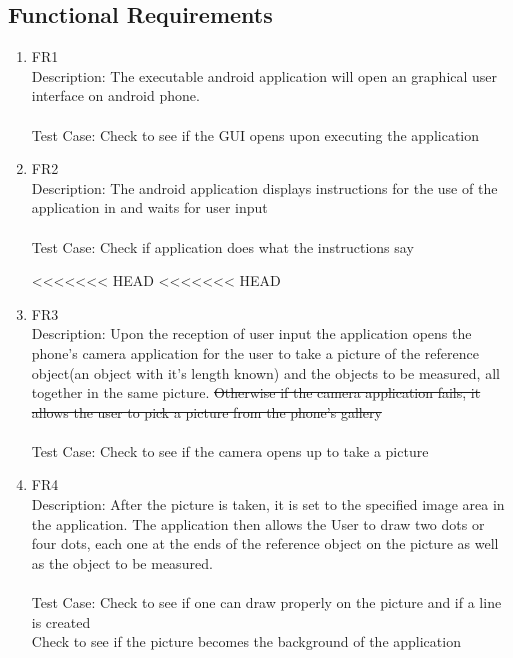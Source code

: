 \documentclass[12pt, titlepage]{article}
\begin{document}
\subsection{Functional Requirements}
\begin{enumerate}{}{}
\item FR1 \\Description: The executable android application will open an graphical user interface on android phone. \\ \\
 Test Case: Check to see if the GUI opens upon executing the application 

\item FR2 \\Description: The android application displays instructions for the use of the application in and waits for user input \\ \\
 Test Case: Check if application does what the instructions say

<<<<<<< HEAD
<<<<<<< HEAD
\item FR3 \\Description: Upon the reception of user input the application opens the phone’s camera application for the user to take a picture of the reference object(an object with it’s length known) and the objects to be measured, all together in the same picture.\sout{ Otherwise if the camera application fails, it allows the user to pick a picture from the phone's gallery} \\ \\
 Test Case: Check to see if the camera opens up to take a picture

\item FR4 \\Description: After the picture is taken, it is set to the specified image area in the application.  The application then allows the User to draw  two dots or four dots, each one at the ends of the reference object on the picture as well as the object to be measured. \\\\
 Test Case: Check to see if one can draw properly on the picture and if a line is created\\ 
  Check to see if the picture becomes the background of the application


\end{enumerate}
\end{document}
